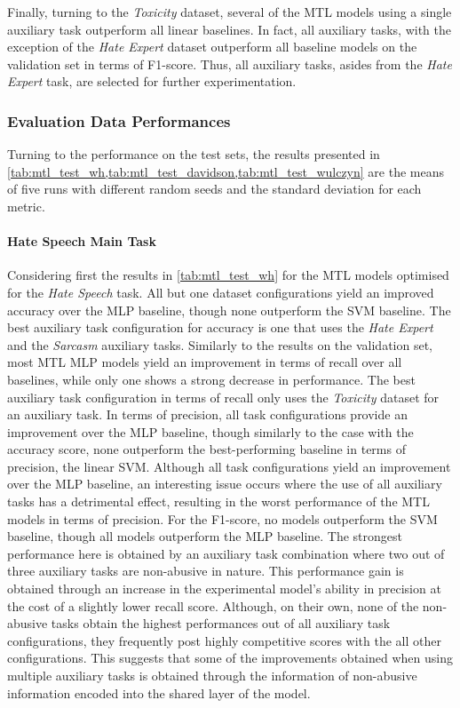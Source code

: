 Finally, turning to the \textit{Toxicity} dataset, several of the MTL models using a single auxiliary task outperform all linear baselines.
In fact, all auxiliary tasks, with the exception of the \textit{Hate Expert} dataset outperform all baseline models on the validation set in terms of F1-score.
Thus, all auxiliary tasks, asides from the \textit{Hate Expert} task, are selected for further experimentation.\vspace{5mm}

\subsubsection{Evaluation Data Performances}
Turning to the performance on the test sets, the results presented in \cref{tab:mtl_test_wh,tab:mtl_test_davidson,tab:mtl_test_wulczyn} are the means of five runs with different random seeds and the standard deviation for each metric.

\paragraph{Hate Speech Main Task}
Considering first the results in \cref{tab:mtl_test_wh} for the MTL models optimised for the \textit{Hate Speech} task.
All but one dataset configurations yield an improved accuracy over the MLP baseline, though none outperform the SVM baseline.
The best auxiliary task configuration for accuracy is one that uses the \textit{Hate Expert} and the \textit{Sarcasm} auxiliary tasks.
Similarly to the results on the validation set, most MTL MLP models yield an improvement in terms of recall over all baselines, while only one shows a strong decrease in performance.
The best auxiliary task configuration in terms of recall only uses the \textit{Toxicity} dataset for an auxiliary task.
In terms of precision, all task configurations provide an improvement over the MLP baseline, though similarly to the case with the accuracy score, none outperform the best-performing baseline in terms of precision, the linear SVM.
Although all task configurations yield an improvement over the MLP baseline, an interesting issue occurs where the use of all auxiliary tasks has a detrimental effect, resulting in the worst performance of the MTL models in terms of precision.
For the F1-score, no models outperform the SVM baseline, though all models outperform the MLP baseline.
The strongest performance here is obtained by an auxiliary task combination where two out of three auxiliary tasks are non-abusive in nature.
This performance gain is obtained through an increase in the experimental model's ability in precision at the cost of a slightly lower recall score.
Although, on their own, none of the non-abusive tasks obtain the highest performances out of all auxiliary task configurations, they frequently post highly competitive scores with the all other configurations.
This suggests that some of the improvements obtained when using multiple auxiliary tasks is obtained through the information of non-abusive information encoded into the shared layer of the model.

